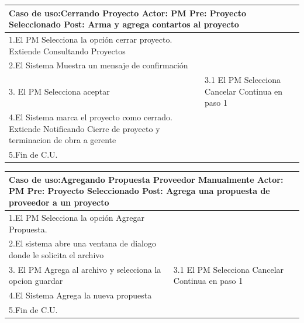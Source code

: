 \begin{longtable}{|p{}|p{}|}
    \hline
    \multicolumn{2}{|p{16cm}|}{
        \textbf{Caso de uso:}Cerrando Proyecto \newline
        \textbf{Actor:} PM\newline
        \textbf{Pre: }Proyecto Seleccionado\newline
        \textbf{Post:} Arma y agrega contartos al proyecto
    }\\
    \hline
    1.El PM Selecciona la opción cerrar proyecto. Extiende Consultando Proyectos & \\
    \hline
    2.El Sistema Muestra un mensaje de confirmación& \\
    \hline
    3. El PM Selecciona aceptar & 3.1 El PM Selecciona Cancelar \newline 3.2 Continua en paso 1\\
    \hline
    4.El Sistema marca el proyecto como cerrado. Extiende Notificando Cierre de proyecto y terminacion de obra a gerente &\\
    \hline
    5.Fin de C.U. &\\
    \hline
\end{longtable}

\begin{longtable}{|p{}|p{}|}
    \hline
    \multicolumn{2}{|p{16cm}|}{
        \textbf{Caso de uso:}Agregando Propuesta Proveedor Manualmente \newline
        \textbf{Actor:} PM\newline
        \textbf{Pre: }Proyecto Seleccionado\newline
        \textbf{Post:} Agrega una propuesta de proveedor a un proyecto
    }\\
    \hline
    1.El PM Selecciona la opción Agregar Propuesta.& \\
    \hline
    2.El sistema abre una ventana de dialogo donde le solicita el archivo& \\
    \hline
    3. El PM Agrega al archivo y selecciona la opcion guardar & 3.1 El PM Selecciona Cancelar \newline 3.2 Continua en paso 1\\
    \hline
    4.El Sistema Agrega la nueva propuesta&\\
    \hline
    5.Fin de C.U. &\\
    \hline
\end{longtable}

